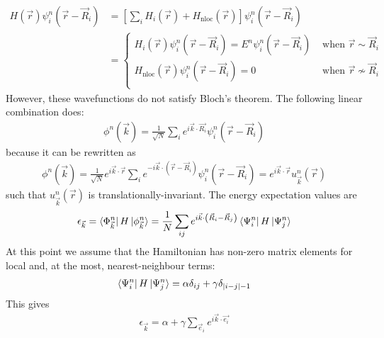 \documentclass[12pt]{article}
\numberwithin{equation}{section}
\begin{document}
\begin{equation}\begin{aligned}
	H(\vec r)\psi_i^n(\vec r - \vec R_i) &= \left[\sum_i H_i(\vec r) + H_\text{nloc}(\vec r)\right] \psi_i^n(\vec r - \vec R_i)\\
					   &= \begin{cases}
						   H_i(\vec r)\psi_i^n(\vec r - \vec R_i) = E^n\psi_i^n(\vec r - \vec R_i) & \text{ when }\vec r \sim \vec R_i\\
						   H_\text{nloc}(\vec r) \psi_i^n(\vec r - \vec R_i) = 0 & \text{ when }\vec r \nsim \vec R_i\\
	\end{cases}
\end{aligned}\end{equation}
However, these wavefunctions do not satisfy Bloch's theorem. The following linear combination does:
\begin{equation}\begin{aligned}
	\phi^n(\vec k) = \frac{1}{\sqrt N}\sum_{i}e^{i \vec{k}\cdot\vec{R_i}}\psi^n_i(\vec r - \vec R_i)
\end{aligned}\end{equation}
because it can be rewritten as
\begin{equation}\begin{aligned}
	\phi^n(\vec k) = \frac{1}{\sqrt N}e^{i \vec{k}\cdot\vec{r}}\sum_{i}e^{-i \vec{k}\cdot\left(\vec r-\vec R_i\right)}\psi^n_i(\vec r - \vec R_i) = e^{i \vec{k}\cdot\vec{r}} u^n_{\vec k}(\vec r)
\end{aligned}\end{equation}
such that \(u^n_{\vec k}(\vec r)\) is translationally-invariant. The energy expectation values are
\begin{equation}\begin{aligned}
	\epsilon_{\vec k} = \bra{\Phi^n_{\vec k}}H\ket{\phi^n_{\vec k}} = \frac{1}{N}\sum_{ij}e^{i \vec k \cdot\left(\vec R_i - \vec R_j\right)}\bra{\Psi^n_i}H\ket{\Psi^n_j}
\end{aligned}\end{equation}
At this point we assume that the Hamiltonian has non-zero matrix elements for local and, at the most, nearest-neighbour terms:
\begin{equation}\begin{aligned}
	\bra{\Psi^n_i}H\ket{\Psi^n_j} = \alpha \delta_{ij} + \gamma \delta_{|i-j| - 1}
\end{aligned}\end{equation}
This gives
\begin{equation}\begin{aligned}
	\epsilon_{\vec k} = \alpha + \gamma\sum_{\vec e_i}e^{i \vec{ k}\cdot\vec{ e_i}}
\end{aligned}\end{equation}
\end{document}
